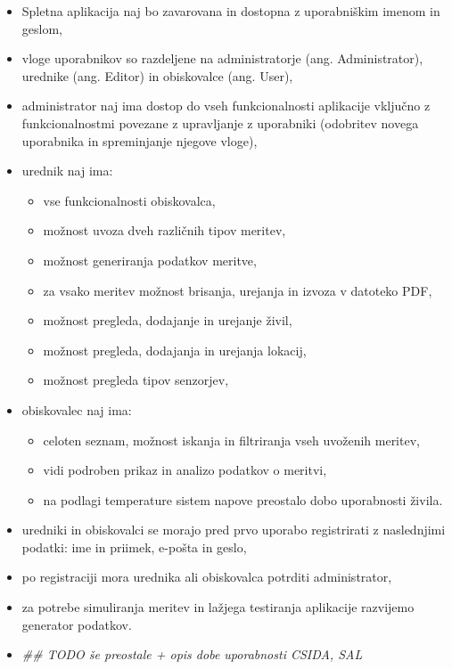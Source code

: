 \documentclass[a4paper, 12pt]{book}
\begin{document}
\begin{itemize}
\item Spletna aplikacija naj bo zavarovana in dostopna z uporabniškim imenom in geslom,

\item vloge uporabnikov so razdeljene na administratorje (ang. Administrator), urednike (ang. Editor) in obiskovalce (ang. User),  

\item administrator naj ima dostop do vseh funkcionalnosti aplikacije vključno z funkcionalnostmi povezane z upravljanje z uporabniki (odobritev novega uporabnika in spreminjanje njegove vloge),

\item urednik naj ima:
	\begin{itemize}
		\item vse funkcionalnosti obiskovalca,
		
		\item možnost uvoza dveh različnih tipov meritev,

		\item možnost generiranja podatkov meritve,

		\item za vsako meritev možnost brisanja, urejanja in izvoza v datoteko PDF,

		\item možnost pregleda, dodajanje in urejanje živil,

		\item možnost pregleda, dodajanja in urejanja lokacij,

		\item možnost pregleda tipov senzorjev,
	\end{itemize}

\item obiskovalec naj ima:
	\begin{itemize}
		\item celoten seznam, možnost iskanja in filtriranja vseh uvoženih meritev,
		
		\item vidi podroben prikaz in analizo podatkov o meritvi,
		
		\item na podlagi temperature sistem  napove preostalo dobo uporabnosti živila.
	\end{itemize}
	
\item uredniki in obiskovalci se morajo pred prvo uporabo registrirati z naslednjimi podatki: ime in priimek, e-pošta in geslo,

\item po registraciji mora urednika ali obiskovalca potrditi administrator,

\item za potrebe simuliranja meritev in lažjega testiranja aplikacije razvijemo generator podatkov.

\item \color{orange} \textit{ \#\# TODO še preostale + opis dobe uporabnosti CSIDA, SAL}
\end{itemize}
\end{document}
